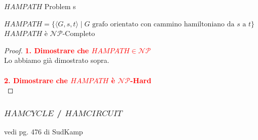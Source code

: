 \documentclass{article}  %
\theoremstyle{definition}
\begin{document}
\begin{theorem}{$HAMPATH$ Problem}
	s\footnotesize
	\begin{center}
		$HAMPATH = \{\langle G,s,t \rangle \mid G \text{ grafo orientato con cammino hamiltoniano da } s \text{ a } t\}$ \\
		$HAMPATH$ è $\mathcal{NP}$-Completo
	\end{center}
	\begin{proof}
		\textcolor{red}{\textbf{1. Dimostrare che $HAMPATH \in \mathcal{NP}$}} \\
		Lo abbiamo già dimostrato sopra. \\ \\
		\textcolor{red}{\textbf{2. Dimostrare che $HAMPATH$ è $\mathcal{NP}$-Hard}} \\
	\end{proof}
\end{theorem}
\break
\subsubsection{$HAMCYCLE$ / $HAMCIRCUIT$}
vedi pg. 476 di SudKamp


\break
\end{document}
